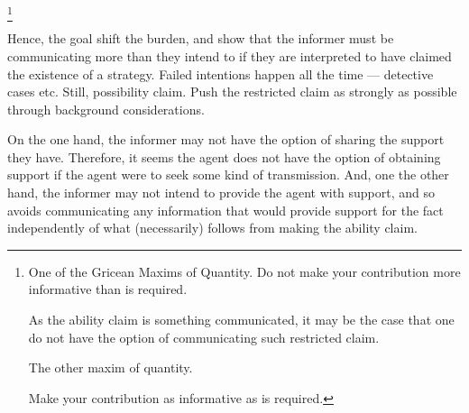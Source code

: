 \documentclass[10pt]{article}
\newcommand{\hozlinedash}[0]{%
  \noindent\hdashrule[0.5ex][c]{\textwidth}{.1pt}{2.5pt}
}
\begin{document}
\citeauthor{Grice:1989uf}\footnote{
One of the Gricean Maxims of Quantity.
Do not make your contribution more informative than is required.

As the ability claim is something communicated, it may be the case that one do not have the option of communicating such restricted claim.

The other maxim of quantity.

Make your contribution as informative as is required.
}

Hence, the goal shift the burden, and show that the informer must be communicating more than they intend to if they are interpreted to have claimed the existence of a strategy.
Failed intentions happen all the time --- detective cases etc.
Still, possibility claim.
Push the restricted claim as strongly as possible through background considerations.

{
  \color{red}
  On the one hand, the informer may not have the option of sharing the support they have.
  Therefore, it seems the agent does not have the option of obtaining support if the agent were to seek some kind of transmission.
  And, one the other hand, the informer may not intend to provide the agent with support, and so avoids communicating any information that would provide support for the fact independently of what (necessarily) follows from making the ability claim.
}

\hozlinedash
\end{document}
